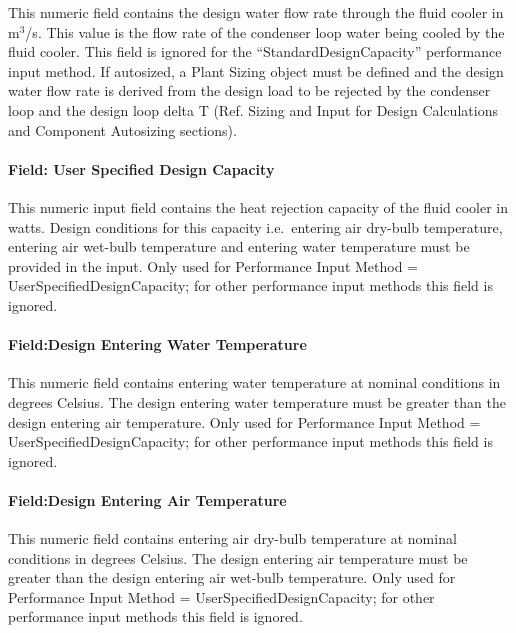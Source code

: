 This numeric field contains the design water flow rate through the fluid cooler in m\(^{3}\)/s. This value is the flow rate of the condenser loop water being cooled by the fluid cooler. This field is ignored for the ``StandardDesignCapacity'' performance input method. If autosized, a Plant Sizing object must be defined and the design water flow rate is derived from the design load to be rejected by the condenser loop and the design loop delta T (Ref. Sizing and Input for Design Calculations and Component Autosizing sections).

\paragraph{Field: User Specified Design Capacity}\label{field-user-specified-design-capacity}

This numeric input field contains the heat rejection capacity of the fluid cooler in watts. Design conditions for this capacity i.e.~entering air dry-bulb temperature, entering air wet-bulb temperature and entering water temperature must be provided in the input. Only used for Performance Input Method = UserSpecifiedDesignCapacity; for other performance input methods this field is ignored.

\paragraph{Field:Design Entering Water Temperature}\label{fielddesign-entering-water-temperature}

This numeric field contains entering water temperature at nominal conditions in degrees Celsius. The design entering water temperature must be greater than the design entering air temperature. Only used for Performance Input Method = UserSpecifiedDesignCapacity; for other performance input methods this field is ignored.

\paragraph{Field:Design Entering Air Temperature}\label{fielddesign-entering-air-temperature}

This numeric field contains entering air dry-bulb temperature at nominal conditions in degrees Celsius. The design entering air temperature must be greater than the design entering air wet-bulb temperature. Only used for Performance Input Method = UserSpecifiedDesignCapacity; for other performance input methods this field is ignored.

